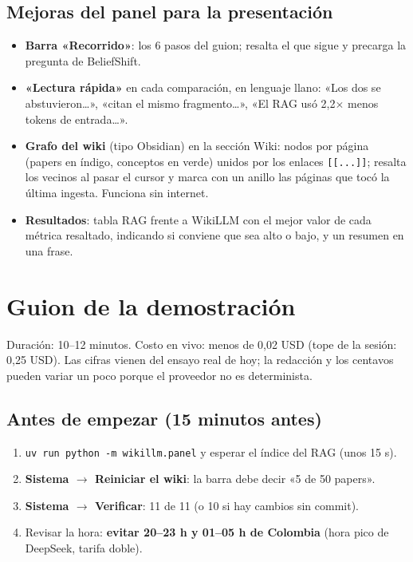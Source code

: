\documentclass[11pt,a4paper]{article}
\newcommand{\cod}[1]{\texttt{\small #1}}
\begin{document}
\subsection{Mejoras del panel para la presentación}
\begin{itemize}
  \item \textbf{Barra «Recorrido»}: los 6 pasos del guion; resalta el que sigue y precarga la
        pregunta de BeliefShift.
  \item \textbf{«Lectura rápida»} en cada comparación, en lenguaje llano: «Los dos se abstuvieron…»,
        «citan el mismo fragmento…», «El RAG usó 2,2$\times$ menos tokens de entrada…».
  \item \textbf{Grafo del wiki} (tipo Obsidian) en la sección Wiki: nodos por página (papers en
        índigo, conceptos en verde) unidos por los enlaces \cod{[[...]]}; resalta los vecinos al
        pasar el cursor y marca con un anillo las páginas que tocó la última ingesta. Funciona sin
        internet.
  \item \textbf{Resultados}: tabla RAG frente a WikiLLM con el mejor valor de cada métrica
        resaltado, indicando si conviene que sea alto o bajo, y un resumen en una frase.
\end{itemize}

\section{Guion de la demostración}

Duración: 10--12 minutos. Costo en vivo: menos de 0,02 USD (tope de la sesión: 0,25 USD). Las
cifras vienen del ensayo real de hoy; la redacción y los centavos pueden variar un poco porque el
proveedor no es determinista.

\subsection*{Antes de empezar (15 minutos antes)}
\begin{enumerate}
  \item \cod{uv run python -m wikillm.panel} y esperar el índice del RAG (unos 15 s).
  \item \textbf{Sistema $\rightarrow$ Reiniciar el wiki}: la barra debe decir «5 de 50 papers».
  \item \textbf{Sistema $\rightarrow$ Verificar}: 11 de 11 (o 10 si hay cambios sin commit).
  \item Revisar la hora: \textbf{evitar 20--23 h y 01--05 h de Colombia} (hora pico de DeepSeek,
        tarifa doble).
\end{enumerate}
\end{document}
